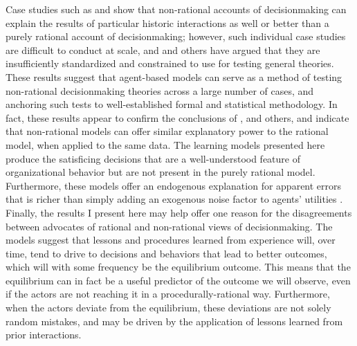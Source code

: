 Case studies such as \citet{allison_1999} and \citet{kaufmann_1994} show that non-rational accounts of decisionmaking can explain the results of particular historic interactions as well or better than a purely rational account of decisionmaking; however, such individual case studies are difficult to conduct at scale, and \citet{achen_1989} and others have argued that they are insufficiently standardized and constrained to use for testing general theories. These results suggest that agent-based models can serve as a method of testing non-rational decisionmaking theories across a large number of cases, and anchoring such tests to well-established formal and statistical methodology. In fact, these results appear to confirm the conclusions of \citet{allison_1999}, \citet{kaufmann_1994} and others, and indicate that non-rational models can offer similar explanatory power to the rational model, when applied to the same data. The learning models presented here produce the satisficing decisions that are a well-understood feature of organizational behavior \citep{march_1993} but are not present in the purely rational model. Furthermore, these models offer an endogenous explanation for apparent errors that is richer than simply adding an exogenous noise factor to agents' utilities \citep{signorino_1999}. Finally, the results I present here may help offer one reason for the disagreements between advocates of rational and non-rational views of decisionmaking. The models suggest that lessons and procedures learned from experience will, over time, tend to drive to decisions and behaviors that lead to better outcomes, which will with some frequency be the equilibrium outcome. This means that the equilibrium can in fact be a useful predictor of the outcome we will observe, even if the actors are not reaching it in a procedurally-rational way. Furthermore, when the actors deviate from the equilibrium, these deviations are not solely random mistakes, and may be driven by the application of lessons learned from prior interactions.


